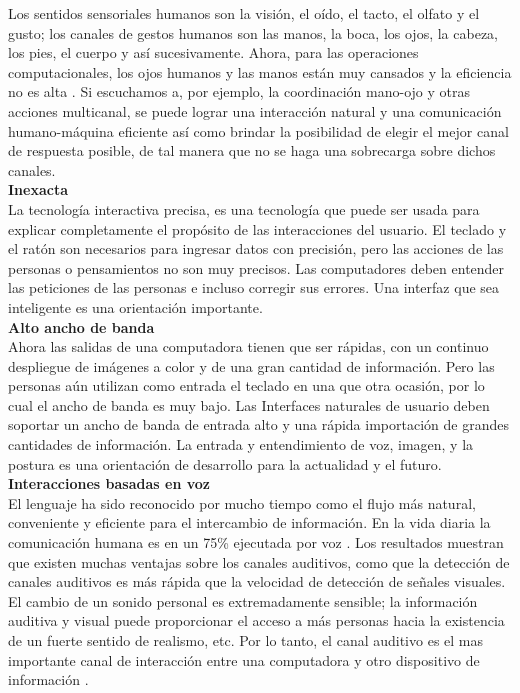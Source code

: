 Los sentidos sensoriales humanos son la visión, el oído, el tacto, el olfato y el gusto; los canales de gestos humanos son las manos, la boca, los ojos, la cabeza, los pies, el cuerpo y así sucesivamente. Ahora, para las operaciones computacionales, los ojos humanos y las manos están muy cansados y la eficiencia no es alta \cite{Weiyuan}. Si escuchamos a, por ejemplo, la coordinación mano-ojo y otras acciones multicanal, se puede lograr una interacción natural y una comunicación humano-máquina eficiente así como brindar la posibilidad de elegir el mejor canal de respuesta posible, de tal manera que no se haga una sobrecarga sobre dichos canales. \\

\textbf{Inexacta} \\

La tecnología interactiva precisa, es una tecnología que puede ser usada para explicar completamente el propósito de las interacciones del usuario. El teclado y el ratón son necesarios para ingresar datos con precisión, pero las acciones de las personas o pensamientos no son muy precisos. Las computadores deben entender las peticiones de las personas e incluso corregir sus errores. Una interfaz que sea inteligente es una orientación importante. \\

\textbf{Alto ancho de banda} \\

Ahora las salidas de una computadora tienen que ser rápidas, con un continuo despliegue de imágenes a color y de una gran cantidad de información. Pero las personas aún utilizan como entrada el teclado en una que otra ocasión, por lo cual el ancho de banda es muy bajo. Las Interfaces naturales de usuario deben soportar un ancho de banda de entrada alto y una rápida importación de grandes cantidades de información. La entrada y entendimiento de voz, imagen, y la postura es una orientación de desarrollo para la actualidad y el futuro. \\

\textbf{Interacciones basadas en voz} \\

El lenguaje ha sido reconocido por mucho tiempo como el flujo más natural, conveniente y eficiente para el intercambio de información. En la vida diaria la comunicación humana es en un 75\% ejecutada por voz \cite{Weiyuan}. Los resultados muestran que existen muchas ventajas sobre los canales auditivos, como que la detección de canales auditivos es más rápida que la velocidad de detección de señales visuales. El cambio de un sonido personal es extremadamente sensible; la información auditiva y visual puede proporcionar el acceso a más personas hacia la existencia de un fuerte sentido de realismo, etc. Por lo tanto, el canal auditivo es el mas importante canal de interacción entre una computadora y otro dispositivo de información \cite{Weiyuan}. \\

